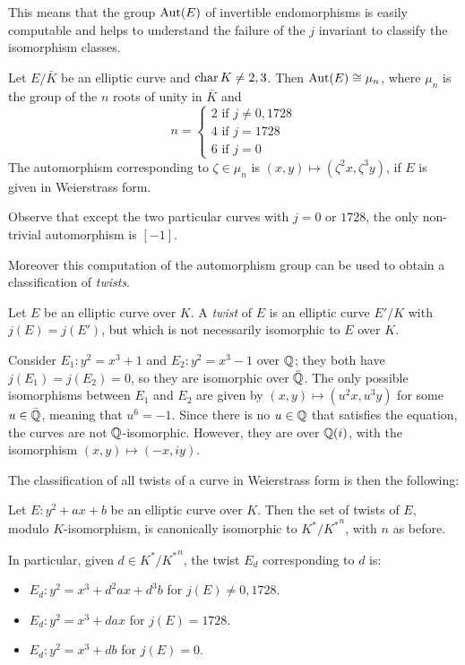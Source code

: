 This means that the group $\operatorname{Aut}(E)$ of invertible endomorphisms is easily computable and helps to understand the failure of the $j$ invariant to classify the isomorphism classes.

\begin{theorem}
    Let $E/\bar K$ be an elliptic curve and $\operatorname{char} K\neq 2,3$. Then $\operatorname{Aut}(E)\cong\mu_n$, where $\mu_n$ is the group of the $n$ roots of unity in $\bar K$ and 
    $$n=\begin{cases}2\text{ if } j\neq0,1728\\ 4 \text{ if } j=1728\\ 6 \text{ if } j=0\end{cases}$$
    The automorphism corresponding to $\zeta\in\mu_n$ is $(x,y)\mapsto(\zeta^2x,\zeta^3y)$, if $E$ is given in Weierstrass form.
\end{theorem}

Observe that except the two particular curves with $j=0$ or $1728$, the only non-trivial automorphism is $[-1]$.

Moreover this computation of the automorphism group can be used to obtain a classification of \emph{twists}.

\begin{definition}
    Let $E$ be an elliptic curve over $K$. A \emph{twist} of $E$ is an elliptic curve $E'/K$ with $j(E)=j(E')$, but which is not necessarily isomorphic to $E$ over $K$.
\end{definition}
\begin{example}
    Consider $E_1:y^2=x^3+1$ and $E_2:y^2=x^3-1$ over $\mathbb{Q}$; they both have $j(E_1)=j(E_2)=0$, so they are isomorphic over $\bar{\mathbb{Q}}$. The only possible isomorphisms between $E_1$ and $E_2$ are given by $(x,y)\mapsto(u^2x,u^3y)$ for some $u\in\bar{\mathbb{Q}}$, meaning that $u^6=-1$. Since there is no $u\in\mathbb{Q}$ that satisfies the equation, the curves are not $\mathbb{Q}$-isomorphic. However, they are over $\mathbb{Q}(i)$, with the isomorphism $(x,y)\mapsto(-x,iy)$.
\end{example}

The classification of all twists of a curve in Weierstrass form is then the following:
\begin{proposition}
    Let $E:y^2+ax+b$ be an elliptic curve over $K$. Then the set of twists of $E$, modulo $K$-isomorphism, is canonically isomorphic to $K^\ast/{K^\ast}^n$, with $n$ as before.
    
    In particular, given $d\in K^\ast/{K^\ast}^n$, the twist $E_d$ corresponding to $d$ is:
    \begin{itemize}
        \item $E_d: y^2=x^3+d^2ax+d^3b$ for $j(E)\neq0,1728$.
        \item $E_d: y^2=x^3+dax$ for $j(E)=1728$.
        \item $E_d: y^2=x^3+db$ for $j(E)=0$.
    \end{itemize}
\end{proposition}

